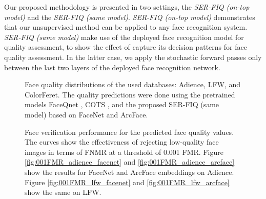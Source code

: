 \documentclass[10pt,twocolumn,letterpaper]{article}
\begin{document}
Our proposed methodology is presented in two settings,
the \textit{SER-FIQ (on-top model)} and the \textit{SER-FIQ (same model)}.
\textit{SER-FIQ (on-top model)} demonstrates that our unsupervised method can be applied to any face recognition system.
\textit{SER-FIQ (same model)} make use of the deployed face recognition model for quality assessment, to show the effect of capture its decision patterns for face quality assessment.
In the latter case, we apply the stochastic forward passes only between the last two layers of the deployed face recognition network. 




\begin{figure}[th]
\centering
{} 
\caption{Face quality distributions of the used databases: Adience, LFW, and ColorFeret. The quality predictions were done using the pretrained models FaceQnet \cite{DBLP:journals/corr/abs-1904-01740}, COTS \cite{COTS}, and the proposed SER-FIQ (same model) based on FaceNet and ArcFace.} \vspace{-2mm}
\label{fig:qualityDistributions}
\end{figure}

\begin{figure*}[h]
\centering
{} \hspace{1mm}
   \hspace{1mm}
 \hspace{1mm}
   \hspace{1mm}
\caption{Face verification performance for the predicted face quality values. The curves show the effectiveness of rejecting low-quality face images in terms of FNMR at a threshold of 0.001 FMR. Figure \ref{fig:001FMR_adience_facenet} and \ref{fig:001FMR_adience_arcface} show the results for FaceNet and ArcFace embeddings on Adience. Figure \ref{fig:001FMR_lfw_facenet} and \ref{fig:001FMR_lfw_arcface} show the same on LFW.} \vspace{-2mm}
\label{fig:001FMR}
\end{figure*}
\end{document}
